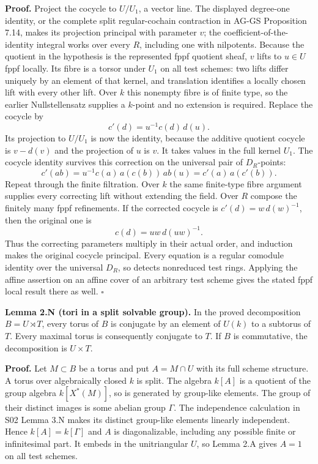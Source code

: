 \documentclass[11pt,a4paper,openany]{report}
\newcounter{none}
\begin{document}
\textbf{Proof.} Project the cocycle to \(U/U_1\), a vector line. The displayed degree-one identity, or the complete split regular-cochain contraction in AG-GS Proposition 7.14, makes its projection principal with parameter \(v\); the coefficient-of-the-identity integral works over every \(R\), including one with nilpotents. Because the quotient in the hypothesis is the represented fppf quotient sheaf, \(v\) lifts to \(u\in U\) fppf locally. Its fibre is a torsor under \(U_1\) on all test schemes: two lifts differ uniquely by an element of that kernel, and translation identifies a locally chosen lift with every other lift. Over \(k\) this nonempty fibre is of finite type, so the earlier Nullstellensatz supplies a \(k\)-point and no extension is required. Replace the cocycle by \[
c'(d)=u^{-1}c(d)\,d(u).
\] Its projection to \(U/U_1\) is now the identity, because the additive quotient cocycle is \(v-d(v)\) and the projection of \(u\) is \(v\). It takes values in the full kernel \(U_1\). The cocycle identity survives this correction on the universal pair of \(D_R\)-points: \[
c'(ab)=u^{-1}c(a)\,a(c(b))\,ab(u)
       =c'(a)\,a(c'(b)).
\] Repeat through the finite filtration. Over \(k\) the same finite-type fibre argument supplies every correcting lift without extending the field. Over \(R\) compose the finitely many fppf refinements. If the corrected cocycle is \(c'(d)=w\,d(w)^{-1}\), then the original one is \[
c(d)=u w\,d(u w)^{-1}.
\] Thus the correcting parameters multiply in their actual order, and induction makes the original cocycle principal. Every equation is a regular comodule identity over the universal \(D_R\), so detects nonreduced test rings. Applying the affine assertion on an affine cover of an arbitrary test scheme gives the stated fppf local result there as well. \(\square\)

\textbf{Lemma 2.N (tori in a split solvable group).} In the proved decomposition \(B=U\rtimes T\), every torus of \(B\) is conjugate by an element of \(U(k)\) to a subtorus of \(T\). Every maximal torus is consequently conjugate to \(T\). If \(B\) is commutative, the decomposition is \(U\times T\).

\textbf{Proof.} Let \(M\subset B\) be a torus and put \(A=M\cap U\) with its full scheme structure. A torus over algebraically closed \(k\) is split. The algebra \(k[A]\) is a quotient of the group algebra \(k[X^*(M)]\), so is generated by group-like elements. The group of their distinct images is some abelian group \(\Gamma\). The independence calculation in S02 Lemma 3.N makes its distinct group-like elements linearly independent. Hence \(k[A]=k[\Gamma]\) and \(A\) is diagonalizable, including any possible finite or infinitesimal part. It embeds in the unitriangular \(U\), so Lemma 2.A gives \(A=1\) on all test schemes.
\end{document}
